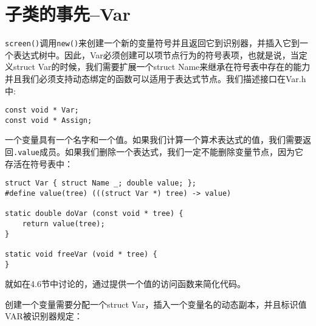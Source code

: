 \section{子类的事先--Var}

\verb|screen()|调用\verb|new()|来创建一个新的变量符号并且返回它到识别器，并插入它到一个表达式树中。因此，Var必须创建可以项节点行为的符号表项，也就是说，当定义struct Var的时候，我们需要扩展一个struct Name来继承在符号表中存在的能力并且我们必须支持动态绑定的函数可以适用于表达式节点。我们描述接口在Var.h中:

\begin{lstlisting}
const void * Var;
const void * Assign;
\end{lstlisting}

一个变量具有一个名字和一个值。如果我们计算一个算术表达式的值，我们需要返回\verb|.value|成员。如果我们删除一个表达式，我们一定不能删除变量节点，因为它存活在符号表中：

\begin{lstlisting}
struct Var { struct Name _; double value; };
#define value(tree) (((struct Var *) tree) -> value)

static double doVar (const void * tree) {
	return value(tree);
}

static void freeVar (void * tree) {
}
\end{lstlisting}

就如在4.6节中讨论的，通过提供一个值的访问函数来简化代码。

创建一个变量需要分配一个struct Var，插入一个变量名的动态副本，并且标识值VAR被识别器规定：

